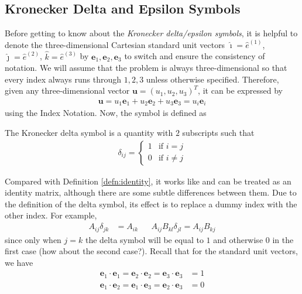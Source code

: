 \subsection{Kronecker Delta and Epsilon Symbols}

Before getting to know about the \textit{Kronecker delta/epsilon symbols}, it is helpful to denote the three-dimensional Cartesian standard unit vectors $\hat{\imath} = \hat{e}^{(1)}$, $\hat{\jmath} = \hat{e}^{(2)}$, $\hat{k} = \hat{e}^{(3)}$ by $\textbf{e}_1, \textbf{e}_2, \textbf{e}_3$ to switch and ensure the consistency of notation. We will assume that the problem is always three-dimensional so that every index always runs through $1,2,3$ unless otherwise specified. Therefore, given any three-dimensional vector $\textbf{u} = (u_1, u_2, u_3)^T$, it can be expressed by 
\begin{align}
\textbf{u} = u_1 \textbf{e}_1 + u_2 \textbf{e}_2 + u_3 \textbf{e}_3 = u_i \textbf{e}_i
\end{align}
using the Index Notation. Now, the  symbol is defined as
\begin{defn}
The Kronecker delta symbol is a quantity with $2$ subscripts such that
\begin{align}
\delta_{ij} = \begin{cases}
1 & \text{if $i=j$} \\
0 & \text{if $i\neq j$}
\end{cases}    
\label{eqn:krondef}
\end{align}
\end{defn}
Compared with Definition \ref{defn:identity}, it works like and can be treated as an identity matrix, although there are some subtle differences between them. Due to the definition of the delta symbol, its effect is to replace a dummy index with the other index. For example,
\begin{align*}
A_{ij}\delta_{jk} &= A_{ik} & & A_{ij}B_{kl}\delta_{jl} = A_{ij}B_{kj}
\end{align*}
since only when $j = k$ the delta symbol will be equal to $1$ and otherwise $0$ in the first case (how about the second case?). Recall that for the standard unit vectors, we have
\begin{subequations}
\begin{align}
\textbf{e}_1 \cdot \textbf{e}_1 = \textbf{e}_2 \cdot \textbf{e}_2 = \textbf{e}_3 \cdot \textbf{e}_3 &= 1 \\
\textbf{e}_1 \cdot \textbf{e}_2 = \textbf{e}_1 \cdot \textbf{e}_3 = \textbf{e}_2 \cdot \textbf{e}_3 &= 0
\end{align}
\end{subequations}
